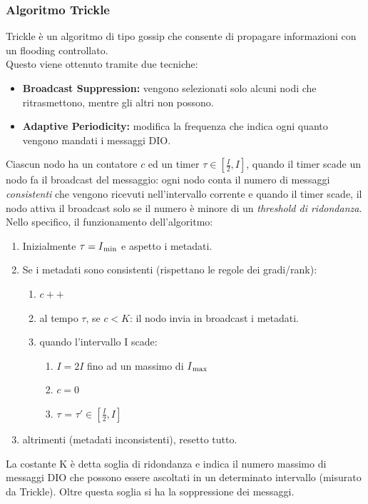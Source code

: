 \documentclass{article}
\begin{document}
\subsubsection{Algoritmo Trickle}
Trickle è un algoritmo di tipo gossip che consente di propagare informazioni con un flooding controllato. \\ Questo viene ottenuto tramite due tecniche:
\begin{itemize}
    \item \textbf{Broadcast Suppression:} vengono selezionati solo alcuni nodi che ritrasmettono, mentre gli altri non possono.
    \item \textbf{Adaptive Periodicity:} modifica la frequenza che indica ogni quanto vengono mandati i messaggi DIO.
\end{itemize}
Ciascun nodo ha un contatore \(\displaystyle c\) ed un timer \(\displaystyle\tau \in [\frac{I}{2}, I]\), quando il timer scade un nodo fa il broadcast del messaggio: ogni nodo conta il numero di messaggi \textit{consistenti} che vengono ricevuti nell'intervallo corrente e quando il timer scade, il nodo attiva il broadcast solo se il numero è minore di un \textit{threshold di ridondanza}. \\ Nello specifico, il funzionamento dell'algoritmo:
\begin{enumerate}
    \item Inizialmente \(\displaystyle \tau = I\textsubscript{min}\) e aspetto i metadati.
    \item Se i metadati sono consistenti (rispettano le regole dei gradi/rank):
    \begin{enumerate}
        \item \(\displaystyle c++\)
        \item al tempo \(\tau\), se \(c < K\): il nodo invia in broadcast i metadati.
        \item quando l'intervallo I scade:
        \begin{enumerate}
            \item \(\displaystyle I = 2I\) fino ad un massimo di \(\displaystyle I\textsubscript{max}\)
            \item \(\displaystyle c=0\)
            \item \(\displaystyle \tau\) = \(\displaystyle \tau' \in [\frac{I}{2}, I]\)
        \end{enumerate}
    \end{enumerate}
    \item altrimenti (metadati inconsistenti), resetto tutto.
\end{enumerate}
La costante K è detta soglia di ridondanza e indica il numero massimo di messaggi DIO che possono essere ascoltati in un determinato intervallo (misurato da Trickle). Oltre questa soglia si ha la soppressione dei messaggi. \\
\end{document}

